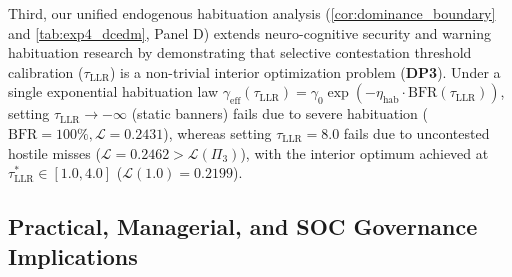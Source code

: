\documentclass[11pt,a4paper]{article}
\begin{document}
Third, our unified endogenous habituation analysis (\cref{cor:dominance_boundary} and \cref{tab:exp4_dcedm}, Panel D) extends neuro-cognitive security and warning habituation research \citep{anderson2016warning, vance2018fog, cram2021technostress, jensen2022improving, hsu2024proactive, tarafdar2017technostress, bartal2026alert} by demonstrating that selective contestation threshold calibration ($\tau_{\text{LLR}}$) is a non-trivial interior optimization problem (\textbf{DP3}). Under a single exponential habituation law $\gamma_{\text{eff}}(\tau_{\text{LLR}}) = \gamma_0 \exp(-\eta_{\text{hab}} \cdot \text{BFR}(\tau_{\text{LLR}}))$, setting $\tau_{\text{LLR}} \to -\infty$ (static banners) fails due to severe habituation ($\text{BFR} = 100\%, \mathcal{L} = 0.2431$), whereas setting $\tau_{\text{LLR}} = 8.0$ fails due to uncontested hostile misses ($\mathcal{L} = 0.2462 > \mathcal{L}(\Pi_3)$), with the interior optimum achieved at $\tau^*_{\text{LLR}} \in [1.0, 4.0]$ ($\mathcal{L}(1.0) = 0.2199$).

\subsection{Practical, Managerial, and SOC Governance Implications}
\label{subsec:disc_practice}
\end{document}
